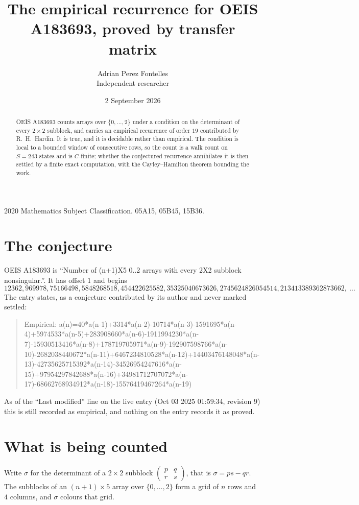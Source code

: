 \documentclass[11pt,a4paper]{article}
\title{The empirical recurrence for OEIS A183693, proved by transfer matrix}
\author{Adrian Perez Fontelles\\ \small Independent researcher}
\date{2 September 2026}
\theoremstyle{plain}
\theoremstyle{definition}
\begin{document}
\maketitle

\begin{abstract}
OEIS A183693 counts arrays over $\{0,\dots,2\}$ under a condition on the determinant of every
$2\times2$ subblock, and carries an empirical recurrence of order $19$ contributed by
R.~H.~Hardin. It is true, and it is decidable rather than empirical. The condition is local to
a bounded window of consecutive rows, so the count is a walk count on $S=243$ states and is
$C$-finite; whether the conjectured recurrence annihilates it is then settled by a finite exact
computation, with the Cayley--Hamilton theorem bounding the work.
\end{abstract}

\noindent\small 2020 Mathematics Subject Classification. 05A15, 05B45, 15B36.\normalsize

\section{The conjecture}

OEIS A183693 is ``Number of (n+1)X5 0..2 arrays with every 2X2 subblock nonsingular.''. It has offset $1$ and begins
\[
12362, 969978, 75166498, 5848268518, 454422625582, 35325040673626, 2745624826054514, 213413389362873662,\ \dots
\]
The entry states, as a conjecture contributed by its author and never marked settled:
\begin{quote}
Empirical: a(n)=40*a(n-1)+3314*a(n-2)-10714*a(n-3)-1591695*a(n-4)+5974533*a(n-5)+283908660*a(n-6)-1911994230*a(n-7)-15930513416*a(n-8)+178719705971*a(n-9)-192907598766*a(n-10)-2682038440672*a(n-11)+6467234810528*a(n-12)+14403476148048*a(n-13)-42735625715392*a(n-14)-34526954247616*a(n-15)+97954297842688*a(n-16)+34981712707072*a(n-17)-68662768934912*a(n-18)-15576419467264*a(n-19)
\end{quote}
As of the ``Last modified'' line on the live entry (Oct 03 2025 01:59:34, revision 9) this is still
recorded as empirical, and nothing on the entry records it as proved.

\section{What is being counted}

Write $\sigma$ for the determinant of a $2\times2$ subblock
$\begin{pmatrix}p&q\\r&s\end{pmatrix}$, that is $\sigma=ps-qr$. The subblocks of an
$(n+1)\times5$ array over $\{0,\dots,2\}$ form a grid of $n$ rows and $4$
columns, and $\sigma$ colours that grid.
\end{document}
